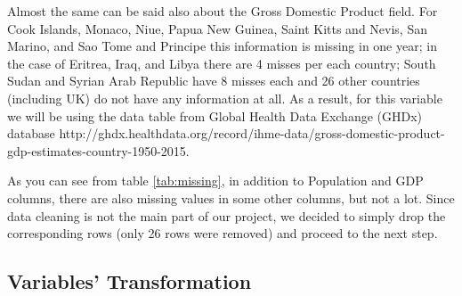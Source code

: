Almost the same can be said also about the Gross Domestic Product field. For Cook Islands, Monaco, Niue, Papua New Guinea, Saint Kitts and Nevis, San Marino, and Sao Tome and Principe this information is missing in one year; in the case of Eritrea, Iraq, and Libya there are 4 misses per each country; South Sudan and Syrian Arab Republic have 8 misses each and 26 other countries (including UK) do not have any information at all. As a result, for this variable we will be using the data table from Global Health Data Exchange (GHDx) database http://ghdx.healthdata.org/record/ihme-data/gross-domestic-product-gdp-estimates-country-1950-2015.

As you can see from table \ref{tab:missing}, in addition to Population and GDP columns, there are also missing values in some other columns, but not a lot. Since data cleaning is not the main part of our project, we decided to simply drop the corresponding rows (only 26 rows were removed) and proceed to the next step.


\subsection{Variables' Transformation}
\label{sec:vari-transf}






